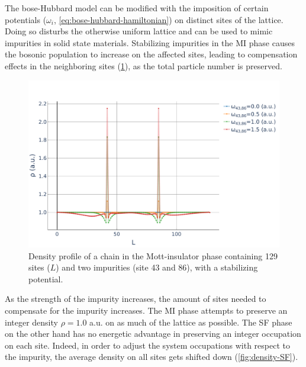 \documentclass[twoside,twocolumn,9pt]{article}
\begin{document}
The bose-Hubbard model can be modified with the imposition of certain potentials ($\omega_i$, \cref{eq:bose-hubbard-hamiltonian}) on distinct sites of the lattice. Doing so disturbs the otherwise uniform lattice and can be used to mimic impurities in solid state materials. Stabilizing impurities in the MI phase causes the bosonic population to increase on the affected sites, leading to compensation effects in the neighboring sites (\cref{fig:density-MI}), as the total particle number is preserved.
\begin{center}
  \begin{figure}
      \includegraphics[width=\linewidth]{../code/figures/Density-profiles-MI.pdf}
      \caption{Density profile of a chain in the Mott-insulator phase containing 129 sites ($L$) and two impurities (site 43 and 86), with a stabilizing potential.}
      \label{fig:density-MI}
  \end{figure}
\end{center}
As the strength of the impurity increases, the amount of sites needed to compensate for the impurity increases. The MI phase attempts to preserve an integer density $\rho=1.0$ a.u. on as much of the lattice as possible. The SF phase on the other hand has no energetic advantage in preserving an integer occupation on each site. Indeed, in order to adjust the system occupations with respect to the impurity, the average density on all sites gets shifted down (\cref{fig:density-SF}).
\end{document}
